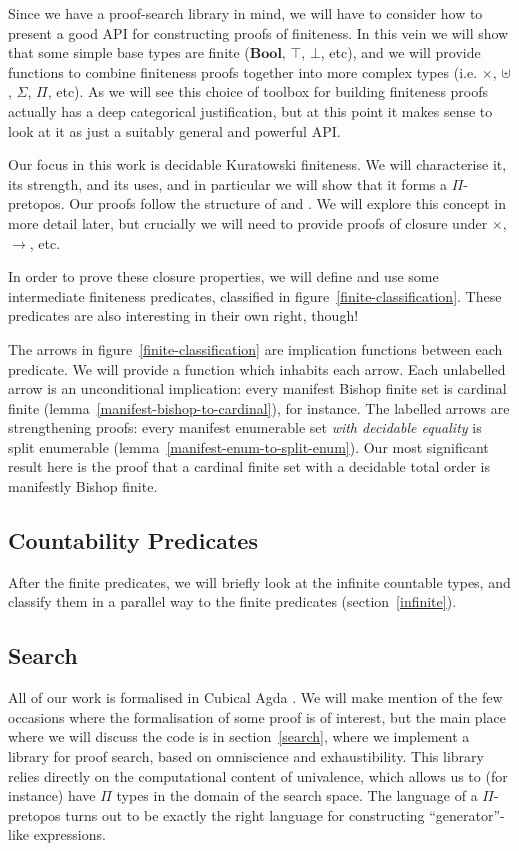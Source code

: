Since we have a proof-search library in mind, we will have to consider how to
present a good API for constructing proofs of finiteness.
In this vein we will show that some simple base types are finite
(\(\mathbf{Bool}\), \(\top\), \(\bot\), etc), and we will provide functions to
combine finiteness proofs together into more complex types (i.e. \(\times\),
\(\uplus\), \(\Sigma\), \(\Pi\), etc).
As we will see this choice of toolbox for building finiteness proofs actually
has a deep categorical justification, but at this point it makes sense to look
at it as just a suitably general and powerful API.



Our focus in this work is decidable Kuratowski finiteness.
We will characterise it, its strength, and its uses, and in particular we will
show that it forms a \(\Pi\)-pretopos.
Our proofs follow the structure of \cite[Chapters 9, 10]{hottbook} and
\cite{rijkeSetsHomotopyType2015}.
We will explore this concept in more detail later, but crucially we will need to
provide proofs of closure under \(\times\), \(\rightarrow\), etc.

In order to prove these closure properties, we will define and use some
intermediate finiteness predicates, classified in
figure~\ref{finite-classification}.
These predicates are also interesting in their own right, though!

The arrows in figure~\ref{finite-classification} are implication functions
between each predicate.
We will provide a function which inhabits each arrow.
Each unlabelled arrow is an unconditional implication: every manifest Bishop
finite set is cardinal finite (lemma~\ref{manifest-bishop-to-cardinal}), for
instance.
The labelled arrows are strengthening proofs: every manifest enumerable set
\emph{with decidable equality} is split enumerable
(lemma~\ref{manifest-enum-to-split-enum}).
Our most significant result here is the proof that a cardinal finite set with a
decidable total order is manifestly Bishop finite.

\subsection{Countability Predicates}
After the finite predicates, we will briefly look at the infinite countable
types, and classify them in a parallel way to the finite predicates
(section~\ref{infinite}).
\subsection{Search}
All of our work is formalised in Cubical Agda
\cite{vezzosiCubicalAgdaDependently2019}.
We will make mention of the few occasions where the formalisation of some proof
is of interest, but the main place where we will discuss the code is in
section~\ref{search}, where we implement a library for proof search, based on
omniscience and exhaustibility.
This library relies directly on the computational content of univalence, which
allows us to (for instance) have \(\Pi\) types in the domain of the search
space.
The language of a \(\Pi\)-pretopos turns out to be exactly the right language
for constructing ``generator''-like expressions.

